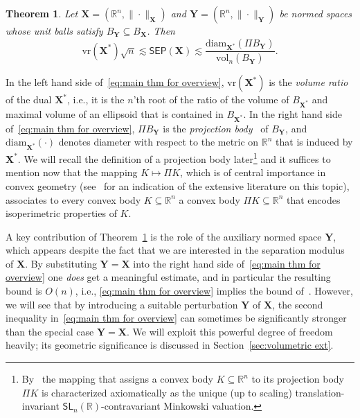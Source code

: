\documentclass[11pt,reqno]{amsart}
\newcommand{\diam}{\mathrm{diam}}
\newcommand{\vr}{\mathrm{vr}}
\newcommand{\X}{\mathbf X}
\newcommand{\Y}{\mathbf Y}
\newcommand{\R}{\mathbb R}
\newtheorem{theorem}{Theorem}
\theoremstyle{remark}
\newcommand{\SL}{\mathsf{SL}}
\renewcommand{\subset}{\subseteq}
\newcommand{\vol}{\mathrm{vol}}
\renewcommand{\1}{\mathbf 1}
\newcommand{\sep}{\mathsf{SEP}}
\begin{document}
\begin{theorem}\label{thm:sep bounds in overview}  Let $\X=(\R^n,\|\cdot\|_\X)$ and $\Y=(\R^n,\|\cdot\|_\Y)$ be normed spaces  whose unit balls satisfy $B_\Y\subset B_\X$. Then
\begin{equation}\label{eq:main thm for overview}
\vr(\X^*)\sqrt{n}\lesssim \sep(\X)\lesssim \frac{\diam_{\X^{\textbf{*}}}(\Pi B_\Y)}{\vol_n(B_{\Y})}.
\end{equation}
\end{theorem}
In the left hand side of~\eqref{eq:main thm for overview}, $\vr(\X^*)$ is the {\em volume ratio}~\cite{Sza78,ST-J80} of the dual $\X^*$, i.e., it is the $n$'th root of the ratio of the volume of $B_{\X^{\textbf{*}}}$ and maximal volume of an ellipsoid that is contained in $B_{\X^{\textbf{*}}}$. In the right hand side of~\eqref{eq:main thm for overview}, $\Pi B_\Y$ is the {\em projection body}~\cite{Pet67} of $B_\Y$, and $\diam_{\X^{\textbf{*}}}(\cdot)$ denotes diameter with respect to the metric on $\R^n$ that is induced by $\X^*$. We will recall the definition of a projection body later\footnote{By~\cite{Lud02,Lud05} the mapping that assigns a convex body $K\subset \R^n$ to its projection body $\Pi K$ is characterized axiomatically  as the unique (up to scaling) translation-invariant $\SL_n(\R)$-contravariant Minkowski valuation.} and it suffices to mention now that the  mapping $K\mapsto \Pi K$, which is of central importance in convex geometry (see~\cite{BL88,Lut93,Gar06,Sch14} for an indication of the extensive literature on this topic), associates to every convex body $K\subset \R^n$  a convex body $\Pi K\subset \R^n$ that encodes isoperimetric properties of $K$.





A key contribution of Theorem~\ref{thm:sep bounds in overview} is the role of the auxiliary normed space $\Y$, which appears despite the fact that we are interested in the separation modulus of $\X$. By substituting $\Y=\X$ into the right hand side of~\eqref{eq:main thm for overview} one {\em does} get a meaningful estimate, and in particular the resulting bound is $O(n)$, i.e., \eqref{eq:main thm for overview} implies the  bound of~\cite{JLS86}. However, we will see  that by introducing a suitable perturbation $\Y$ of $\X$, the second inequality in~\eqref{eq:main thm for overview} can sometimes be significantly  stronger than the special case $\Y=\X$. We will exploit this powerful degree of freedom heavily; its geometric significance is discussed in Section~\ref{sec:volumetric ext}.
\end{document}

